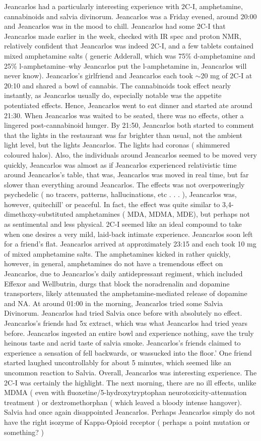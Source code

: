 \documentclass[12pt]{book}
\begin{document}
Jeancarlos had a particularly interesting experience with 2C-I, amphetamine, cannabinoids and salvia divinorum. Jeancarlos was a Friday evened, around 20:00 and Jeancarlos was in the mood to chill. Jeancarlos had some 2C-I that Jeancarlos made earlier in the week, checked with IR spec and proton NMR, relatively confident that Jeancarlos was indeed 2C-I, and a few tablets contained mixed amphetamine salts ( generic Adderall, which was 75\% d-amphetamine and 25\% l-amphetamine--why Jeancarlos put the l-amphetamine in, Jeancarlos will never know). Jeancarlos's girlfriend and Jeancarlos each took $\sim$20 mg of 2C-I at 20:10 and shared a bowl of cannabis. The cannabinoids took effect nearly instantly, as Jeancarlos usually do, especially notable was the appetite potentiated effects. Hence, Jeancarlos went to eat dinner and started ate around 21:30. When Jeancarlos was waited to be seated, there was no effects, other a lingered post-cannabinoid hunger. By 21:50, Jeancarlos both started to comment that the lights in the restaurant was far brighter than usual, not the ambient light level, but the lights Jeancarlos. The lights had coronas ( shimmered coloured halos). Also, the individuals around Jeancarlos seemed to be moved very quickly, Jeancarlos was almost as if Jeancarlos experienced relativistic time around Jeancarlos's table, that was, Jeancarlos was moved in real time, but far slower than everything around Jeancarlos. The effects was not overpoweringly psychedelic ( no tracers, patterns, hallucinations, etc . . .  ), Jeancarlos was, however, quitechill' or peaceful. In fact, the effect was quite similar to 3,4-dimethoxy-substituted amphetamines ( MDA, MDMA, MDE), but perhaps not as sentimental and less physical. 2C-I seemed like an ideal compound to take when one desires a very mild, laid-back intimate experience. Jeancarlos soon left for a friend's flat. Jeancarlos arrived at approximately 23:15 and each took 10 mg of mixed amphetamine salts. The amphetamines kicked in rather quickly, however, in general, amphetamines do not have a tremendous effect on Jeancarlos, due to Jeancarlos's daily antidepressant regiment, which included Effexor and Wellbutrin, durgs that block the noradrenalin and dopamine transporters, likely attenuated the amphetamine-mediated release of dopamine and NA. At around 01:00 in the morning, Jeancarlos tried some Salvia Divinorum. Jeancarlos had tried Salvia once before with absolutely no effect. Jeancarlos's friends had 5x extract, which was what Jeancarlos had tried years before. Jeancarlos ingested an entire bowl and experience nothing, save the truly heinous taste and acrid taste of salvia smoke. Jeancarlos's friends claimed to experience a sensation of fell backwards, or wassucked into the floor.' One friend started laughed uncontrollably for about 5 minutes, which seemed like an uncommon reaction to Salvia. Overall, Jeancarlos was interesting experience. The 2C-I was certainly the highlight. The next morning, there are no ill effects, unlike MDMA ( even with fluoxetine/5-hydroxytryptophan neurotoxicity-attenuation treatment ) or dextromethorphan ( which leaved a bloody intense hangover). Salvia had once again disappointed Jeancarlos. Perhaps Jeancarlos simply do not have the right isozyme of Kappa-Opioid receptor ( perhaps a point mutation or something? )
\end{document}
